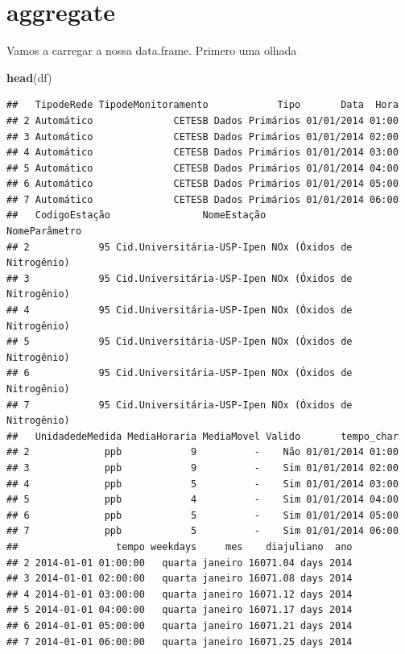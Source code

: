 \documentclass[]{book}
\newenvironment{Shaded}{\begin{snugshade}}{\end{snugshade}}
\newcommand{\KeywordTok}[1]{\textcolor[rgb]{0.13,0.29,0.53}{\textbf{#1}}}
\newcommand{\StringTok}[1]{\textcolor[rgb]{0.31,0.60,0.02}{#1}}
\newcommand{\OperatorTok}[1]{\textcolor[rgb]{0.81,0.36,0.00}{\textbf{#1}}}
\newcommand{\NormalTok}[1]{#1}
\begin{document}
\begin{Shaded}
\end{Shaded}

\section{aggregate}\label{aggregate}

Vamos a carregar a nossa data.frame. Primero uma olhada

\begin{Shaded}
\begin{Highlighting}[]
\KeywordTok{head}\NormalTok{(df)}
\end{Highlighting}
\end{Shaded}

\begin{verbatim}
##   TipodeRede TipodeMonitoramento            Tipo       Data  Hora
## 2 Automático              CETESB Dados Primários 01/01/2014 01:00
## 3 Automático              CETESB Dados Primários 01/01/2014 02:00
## 4 Automático              CETESB Dados Primários 01/01/2014 03:00
## 5 Automático              CETESB Dados Primários 01/01/2014 04:00
## 6 Automático              CETESB Dados Primários 01/01/2014 05:00
## 7 Automático              CETESB Dados Primários 01/01/2014 06:00
##   CodigoEstação                NomeEstação              NomeParâmetro
## 2            95 Cid.Universitária-USP-Ipen NOx (Óxidos de Nitrogênio)
## 3            95 Cid.Universitária-USP-Ipen NOx (Óxidos de Nitrogênio)
## 4            95 Cid.Universitária-USP-Ipen NOx (Óxidos de Nitrogênio)
## 5            95 Cid.Universitária-USP-Ipen NOx (Óxidos de Nitrogênio)
## 6            95 Cid.Universitária-USP-Ipen NOx (Óxidos de Nitrogênio)
## 7            95 Cid.Universitária-USP-Ipen NOx (Óxidos de Nitrogênio)
##   UnidadedeMedida MediaHoraria MediaMovel Valido       tempo_char
## 2             ppb            9          -    Não 01/01/2014 01:00
## 3             ppb            9          -    Sim 01/01/2014 02:00
## 4             ppb            5          -    Sim 01/01/2014 03:00
## 5             ppb            4          -    Sim 01/01/2014 04:00
## 6             ppb            5          -    Sim 01/01/2014 05:00
## 7             ppb            5          -    Sim 01/01/2014 06:00
##                 tempo weekdays     mes    diajuliano  ano
## 2 2014-01-01 01:00:00   quarta janeiro 16071.04 days 2014
## 3 2014-01-01 02:00:00   quarta janeiro 16071.08 days 2014
## 4 2014-01-01 03:00:00   quarta janeiro 16071.12 days 2014
## 5 2014-01-01 04:00:00   quarta janeiro 16071.17 days 2014
## 6 2014-01-01 05:00:00   quarta janeiro 16071.21 days 2014
## 7 2014-01-01 06:00:00   quarta janeiro 16071.25 days 2014
\end{verbatim}
\end{document}

